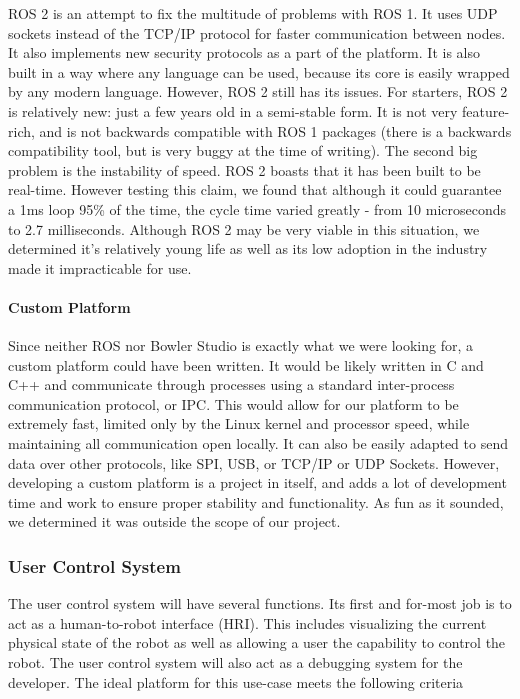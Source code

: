         ROS 2 is an attempt to fix the multitude of problems with ROS 1. It uses UDP sockets instead of the TCP/IP protocol for faster communication between nodes. It also implements new security protocols as a part of the platform. It is also built in a way where any language can be used, because its core is easily wrapped by any modern language. 
        However, ROS 2 still has its issues. For starters, ROS 2 is relatively new: just a few years old in a semi-stable form. It is not very feature-rich, and is not backwards compatible with ROS 1 packages (there is a backwards compatibility tool, but is very buggy at the time of writing). The second big problem is the instability of speed. ROS 2 boasts that it has been built to be real-time. However testing this claim, we found that although it could guarantee a 1ms loop 95\% of the time, the cycle time varied greatly - from 10 microseconds to 2.7 milliseconds. Although ROS 2 may be very viable in this situation, we determined it's relatively young life as well as its low adoption in the industry made it impracticable for use.

        \paragraph*{Custom Platform}
        Since neither ROS nor Bowler Studio is exactly what we were looking for, a custom platform could have been written. It would be likely written in C and C++ and communicate through processes using a standard inter-process communication protocol, or IPC. This would allow for our platform to be extremely fast, limited only by the Linux kernel and processor speed, while maintaining all communication open locally. It can also be easily adapted to send data over other protocols, like SPI, USB, or TCP/IP or UDP Sockets. However, developing a custom platform is a project in itself, and adds a lot of development time and work to ensure proper stability and functionality. As fun as it sounded, we determined it was outside the scope of our project.

        \subsubsection{User Control System}
        The user control system will have several functions. Its first and for-most job is to act as a human-to-robot interface (HRI). This includes visualizing the current physical state of the robot as well as allowing a user the capability to control the robot. The user control system will also act as a debugging system for the developer. The ideal platform for this use-case meets the following criteria

